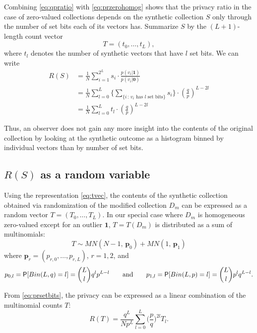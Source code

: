 \documentclass[11pt]{article}
\newcommand{\zv}{\textbf{0}}
\newcommand{\uv}{\textbf{1}}
\begin{document}
Combining \eqref{eq:qpratio} with \eqref{eq:przerohomog} shows that the privacy ratio in the case of zero-valued collections depends on the synthetic collection $S$ only through the number of set bits each of its vectors has.
Summarize $S$ by the $(L+1)$-length count vector
\begin{equation}\label{eq:tvec}
T = (t_0, \dots, t_L),
\end{equation}
where $t_l$ denotes the number of synthetic vectors that have $l$ set bits.
We can write
\begin{align}
R(S) 
&= \frac{1}{N} \sum_{i=1}^{2^L} s_i \cdot \frac{p(v_i|\uv)}{p(v_i|\zv)}
\nonumber \\
&= \frac{1}{N} \sum_{l=0}^{L} \bigg\{ \sum_{\{i\,:\, v_i \text{ has } l \text{ set bits}\}} s_i \bigg\} \cdot  \left ( \frac{q}{p} \right )^ {L - 2l} 
\nonumber \\
&= \frac{1}{N} \sum_{l=0}^{L} t_l \cdot  \left ( \frac{q}{p} \right )^ {L - 2l} 
\label{eq:prsetbits}
\end{align}

Thus, an observer does not gain any more insight into the contents of the original collection by looking at the synthetic outcome as a histogram binned by individual vectors than by number of set bits.

\subsection{$R(S)$ as a random variable}

Using the representation \eqref{eq:tvec}, the contents of the synthetic collection obtained via randomization of the modified collection $D_m$ can be expressed as a random vector $T = (T_0, \dots, T_L)$.
In our special case where $D_m$ is homogeneous zero-valued except for an outlier $\uv$, $T = T(D_m)$ is distributed as a sum of multinomials:
\begin{equation} \label{eq:tdistrib}
T \sim MN(N-1,\, \boldsymbol{p}_0) + MN(1,\, \boldsymbol{p}_1)
\end{equation}
where $\boldsymbol{p}_r = (p_{r,0},\dots,p_{r,L})$, $r = 1,2$, and
\[ p_{0,l} = \P[Bin(L, q) = l] = \binom{L}{l}q^l p^{L-l} \qquad\text{and}\qquad
p_{1,l} = \P[Bin(L, p) = l] = \binom{L}{l}p^l q^{L-l}. \]

From \eqref{eq:prsetbits}, the privacy can be expressed as a linear combination of the multinomial counts $T$:
\begin{equation} \label{eq:prt}
R(T) = \frac{q^L}{Np^L}\sum_{l=0}^L \bigg(\frac{p}{q}\bigg)^{2l} T_l .
\end{equation}
\end{document}
